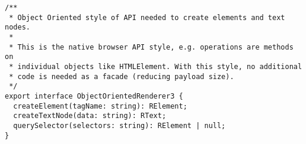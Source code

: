 \begin{verbatim}
/**
 * Object Oriented style of API needed to create elements and text nodes.
 *
 * This is the native browser API style, e.g. operations are methods on
 * individual objects like HTMLElement. With this style, no additional
 * code is needed as a facade (reducing payload size).
 */
export interface ObjectOrientedRenderer3 {
  createElement(tagName: string): RElement;
  createTextNode(data: string): RText;
  querySelector(selectors: string): RElement | null;
}
\end{verbatim}
